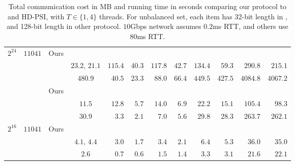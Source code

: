 \begin{table*}[t]
{\begin{tabular}{|c|c||c||c||r|r||r|r||r|r||r|r|}
						
			\multirow{4}{*}{$2^{24}$} & \multirow{4}{*}{$11041$}&Ours &&&&&&&&& 
			\\ \cline{3-12}
			& &            \cite{CCS:CheLaiRin17}            &       $23.2$, $21.1$        & $115.4$ &                $40.3$ & $117.8$ &                 $42.7$ &      $134.4$ &           $59.3$ & $290.8$ &   $215.1$ \\ \cline{3-12}
			&                          &    \cite{TOPS:PSZ18}     &             $480.9$              &  $40.5$ &                $23.3$ &  $88.0$ &                 $66.4$ &      $449.5$ &          $427.5$ &     $4084.8$ &       $4067.2$ \\  \cline{1-12}
		
			\multirow{3}{*}{$2^{20}$} & \multirow{3}{*}{$11041$} &Ours &&&&&&&&& 
			\\ \cline{3-12}
			& &  \cite{CCS:CheLaiRin17}            &              $11.5$              &  $12.8$ &                 $5.7$ &  $14.0$ &                  $6.9$ &       $22.2$ &           $15.1$ &      $105.4$ &         $98.3$ \\ \cline{3-12}
			&                          &    \cite{TOPS:PSZ18}     &              $30.9$              &   $3.3$ &                 $2.1$ &   $7.0$ &                  $5.6$ &       $29.8$ &           $28.3$ &      $263.7$ &        $262.1$ \\ \cline{1-12}
	
			\multirow{3}{*}{$2^{16}$} & \multirow{3}{*}{$11041$} &Ours &&&&&&&&& 
			\\ \cline{3-12}
			& &             \cite{CCS:CheLaiRin17}            &        $4.1$, $4.4$         &   $3.0$ &            $1.7$ &   $3.4$ &             $2.1$ &        $6.4$ &       $5.3$ &       $36.0$ &         $35.0$ \\ \cline{3-12}
			&                          &    \cite{TOPS:PSZ18}     &              $2.6$               &   $0.7$ &                 $0.6$ &   $1.5$ &                  $1.4$ &        $3.3$ &            $3.1$ &       $21.6$ &         $22.1$ \\  \cline{1-12}
		\end{tabular}
		\caption{Total communication cost in {\normalfont MB} and running time in seconds comparing our protocol to \cite{TOPS:PSZ18,CCS:KKRT16,CCS:CheLaiRin17} and HD-PSI, with $T\in \{1,4\}$ threads. For unbalanced set, each item has 32-bit length in \cite{TOPS:PSZ18,CCS:CheLaiRin17}, and 128-bit length in other protocol.  {\normalfont $10$Gbps} network assumes { $0.2$ms RTT}, and others use { $80$ms RTT}.}
		\label{table:overall}
	}
\end{table*}
